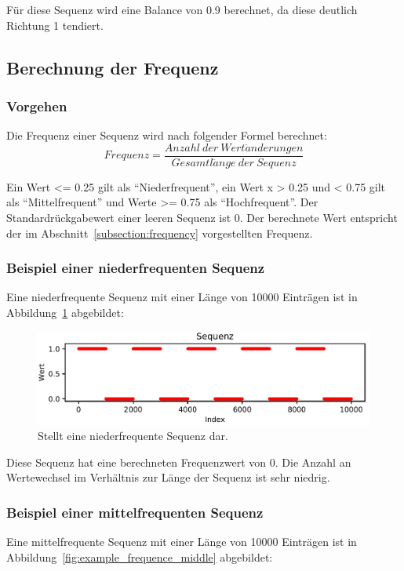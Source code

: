 Für diese Sequenz wird eine Balance von 0.9 berechnet, da diese deutlich Richtung 1 tendiert. 
\subsection{Berechnung der Frequenz}

\subsubsection{Vorgehen}
Die Frequenz einer Sequenz wird nach folgender Formel berechnet:
\[
Frequenz = \frac{Anzahl\ der\ Wert\ddot{a}nderungen}{Gesamtl\ddot{a}nge\ der\ Sequenz}
\]

Ein Wert <= 0.25 gilt als \enquote{Niederfrequent}, ein Wert x > 0.25 und < 0.75 gilt als \enquote{Mittelfrequent} und Werte >= 0.75 als \enquote{Hochfrequent}.
Der Standardrückgabewert einer leeren Sequenz ist 0. 
Der berechnete Wert entspricht der im Abschnitt~\ref{subsection:frequency} vorgestellten Frequenz.

\subsubsection{Beispiel einer niederfrequenten Sequenz}
Eine niederfrequente Sequenz mit einer Länge von 10000 Einträgen ist in Abbildung~\ref{fig:example_frequence_low} abgebildet:

\begin{figure}[H]
	\includegraphics[width=\linewidth]{pythonImplementation/images/example_frequence_low.PNG}
	\caption[Darstellung einer niederfrequenten Sequenz]{Stellt eine niederfrequente Sequenz dar\footnotemark.}
	\label{fig:example_frequence_low}
\end{figure}

Diese Sequenz hat eine berechneten Frequenzwert von 0. Die Anzahl an Wertewechsel im Verhältnis zur Länge der Sequenz ist sehr niedrig.

\subsubsection{Beispiel einer mittelfrequenten Sequenz}
Eine mittelfrequente Sequenz mit einer Länge von 10000 Einträgen ist in Abbildung~\ref{fig:example_frequence_middle} abgebildet:

